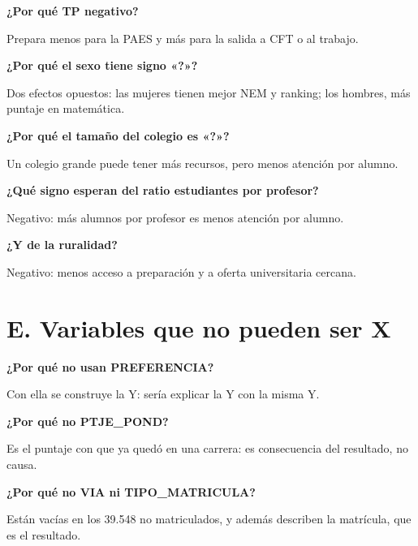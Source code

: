 \documentclass[11pt]{article}
\begin{document}
\textbf{¿Por qué TP negativo?}\par
\begin{guion}Prepara menos para la PAES y más para la salida a CFT o al trabajo.\end{guion}

\textbf{¿Por qué el sexo tiene signo «?»?}\par
\begin{guion}Dos efectos opuestos: las mujeres tienen mejor NEM y ranking; los hombres, más puntaje en matemática.\end{guion}

\textbf{¿Por qué el tamaño del colegio es «?»?}\par
\begin{guion}Un colegio grande puede tener más recursos, pero menos atención por alumno.\end{guion}

\textbf{¿Qué signo esperan del ratio estudiantes por profesor?}\par
\begin{guion}Negativo: más alumnos por profesor es menos atención por alumno.\end{guion}

\textbf{¿Y de la ruralidad?}\par
\begin{guion}Negativo: menos acceso a preparación y a oferta universitaria cercana.\end{guion}

\section*{E. Variables que no pueden ser X}

\textbf{¿Por qué no usan PREFERENCIA?}\par
\begin{guion}Con ella se construye la Y: sería explicar la Y con la misma Y.\end{guion}

\textbf{¿Por qué no PTJE\_POND?}\par
\begin{guion}Es el puntaje con que ya quedó en una carrera: es consecuencia del resultado, no causa.\end{guion}

\textbf{¿Por qué no VIA ni TIPO\_MATRICULA?}\par
\begin{guion}Están vacías en los 39.548 no matriculados, y además describen la matrícula, que es el resultado.\end{guion}
\end{document}
